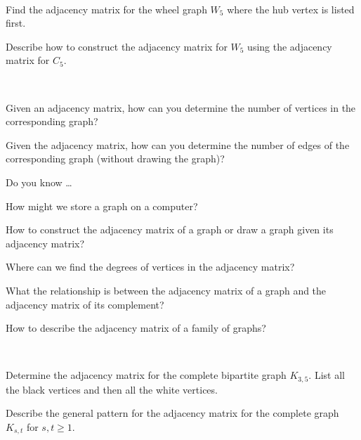 \begin{exer}[\exerU] %
\label{exer_adj_matrix_wheels}
~
    \begin{exerpart}
        \item Find the adjacency matrix for the wheel graph $W_5$ where the hub vertex is listed first.
        \item Describe how to construct the adjacency matrix for $W_5$ using the adjacency matrix for $C_5$.
    \end{exerpart}
\end{exer} 

\begin{exer}[\exerU] %
\label{exer_adj_mat_info}
~
    \begin{exerpart}
        \item Given an adjacency matrix, how can you determine the number of vertices in the corresponding graph?
        \item Given the adjacency matrix, how can you determine the number of edges of the corresponding graph (without drawing the graph)?
    \end{exerpart}
\end{exer}

\begin{exer}[\exerR] %
\label{exer_dyk_adj_matrix}
    Do you know \ldots
        \begin{exerpart}
            \item How might we store a graph on a computer?
            \item How to construct the adjacency matrix of a graph or draw a graph given its adjacency matrix?
            \item Where can we find the degrees of vertices in the adjacency matrix?
            \item What the relationship is between the adjacency matrix of a graph and the adjacency matrix of its complement?
            \item How to describe the adjacency matrix of a family of graphs? 
        \end{exerpart}
\end{exer}

\begin{exer}[\exerE] %
\label{exer_adj_mat_complete}
~
    \begin{exerpart}
        \item Determine the adjacency matrix for the complete bipartite graph $K_{3,5}$.  List all the black vertices and then all the white vertices.
        \item Describe the general pattern for the adjacency matrix for the complete graph $K_{s,t}$ for $s,t \ge 1$. 
    \end{exerpart}
\end{exer}

